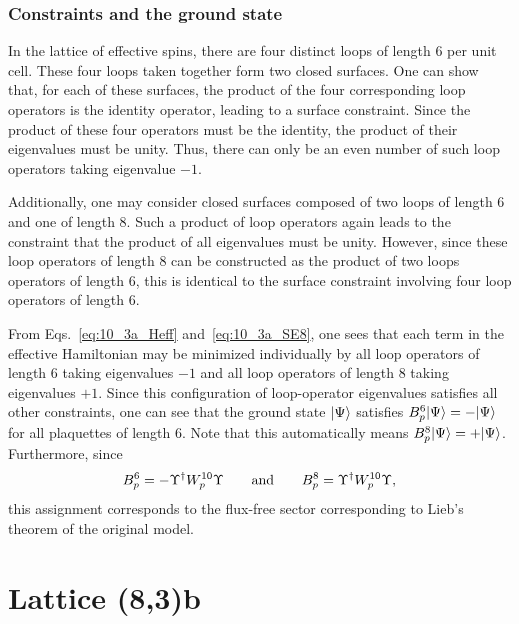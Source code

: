 %
%
\subsubsection{Constraints and the ground state}
%
%
In the lattice of effective spins, there are four distinct loops of length 6 per unit cell.
These four loops taken together form two closed surfaces.
One can show that, for each of these surfaces, the product of the four corresponding loop operators is the identity operator, leading to a surface constraint.
Since the product of these four operators must be the identity, the product of their eigenvalues must be unity.
Thus, there can only be an even number of such loop operators taking eigenvalue $-1$.

Additionally, one may consider closed surfaces composed of two loops of length 6 and one of length 8.
Such a product of loop operators again leads to the constraint that the product of all eigenvalues must be unity.
However, since these loop operators of length 8 can be constructed as the product of two loops operators of length 6, this is identical to the surface constraint involving four loop operators of length 6.

From Eqs.~\eqref{eq:10_3a_Heff} and~\eqref{eq:10_3a_SE8}, one sees that each term in the effective Hamiltonian may be minimized individually by all loop operators of length 6 taking eigenvalues $-1$ and all loop operators of length 8 taking eigenvalues $+1$.
Since this configuration of loop-operator eigenvalues satisfies all other constraints, one can see that the ground state $\ket{\Psi}$ satisfies $B_p^6 \ket{\Psi} = -\ket{\Psi}$ for all plaquettes of length 6.
Note that this automatically means $B_p^8 \ket{\Psi} = +\ket{\Psi}$.
Furthermore, since
%
\begin{equation}
	B_p^6 = -\Upsilon\dag W_p^{10} \Upsilon \qquad{\rm and}\qquad B_p^8 = \Upsilon\dag W_p^{10} \Upsilon,
\end{equation}
%
this assignment corresponds to the flux-free sector corresponding to Lieb's theorem of the original model.


%
%
\section{Lattice (8,3)b}
\label{appendix:LoopModels_8_3b}
%
%
